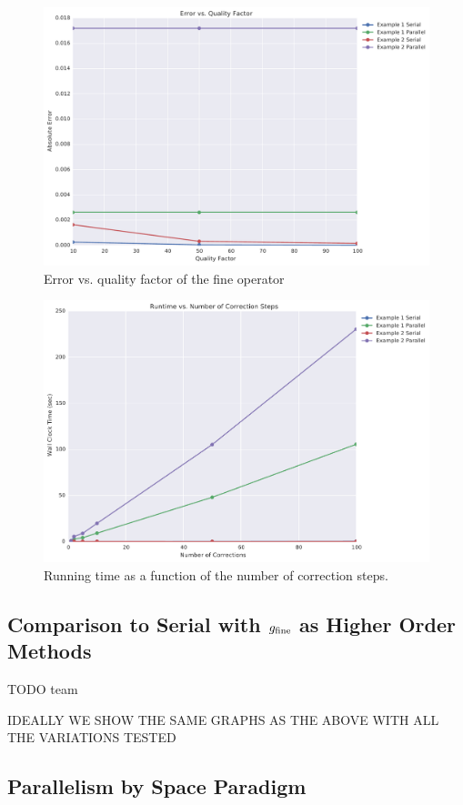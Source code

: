 \documentclass[letterpaper,12pt]{article}
\begin{document}
\begin{figure}
\begin{center}
\includegraphics[width=0.75\linewidth]{data/error_vs_qualityfactor.pdf}
\caption{Error vs. quality factor of the fine operator}
\label{fig:err_v_q}
\end{center}
\end{figure}

\begin{figure}
\begin{center}
\includegraphics[width=0.75\linewidth]{data/runtime_vs_corrections.pdf}
\caption{Running time as a function of the number of correction steps.}
\label{fig:run_v_k}
\end{center}
\end{figure}

\subsection{Comparison to Serial with $g_{\textnormal{fine}}$ as Higher Order Methods}

TODO team

IDEALLY WE SHOW THE SAME GRAPHS AS THE ABOVE WITH ALL THE VARIATIONS TESTED

\subsection{Parallelism by Space Paradigm}
\end{document}
